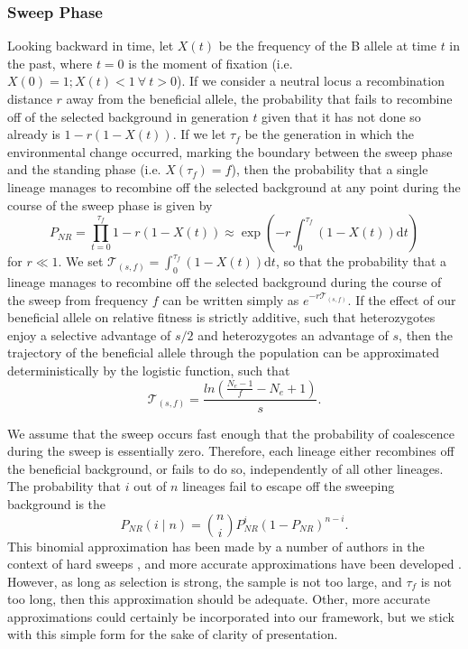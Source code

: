 \documentclass[a4paper,10pt]{article}
\begin{document}
\subsubsection{Sweep Phase}
Looking backward in time, let $X\left(t\right)$ be the frequency of the B allele at time $t$ in the past, where $t=0$ is the moment of fixation (i.e. $X\left(0\right) = 1; X\left(t\right) < 1\ \forall\ t > 0$). If we consider a neutral locus a recombination distance $r$ away from the beneficial allele, the probability that  fails to recombine off of the selected background in generation $t$ given that it has not done so already is $1-r\left(1-X(t)\right)$. If we let $\tau_{f}$ be the generation in which the environmental change occurred, marking the boundary between the sweep phase and the standing phase (i.e. $X\left(\tau_{f}\right) = f$), then the probability that a single lineage manages to recombine off the selected background at any point during the course of the sweep phase is given by
\begin{equation}
P_{NR} = \prod_{t=0}^{\tau_{f}} 1-r\left(1-X(t)\right)  \approx \exp \left(-r \int_0^{\tau_{f}}(1-X\left(t\right))\mathrm{d} t \right)
\end{equation}
for $r \ll 1$. We set  $\mathcal{T}_{\left(s,f\right)} = \int_0^{\tau_{f}}(1-X\left(t\right))\mathrm{d}t$, so that the probability that a lineage manages to recombine off the selected background during the course of the sweep from frequency $f$ can be written simply as $e^{-r\mathcal{T}_{\left(s,f\right)}}$. If the effect of our beneficial allele on relative fitness is strictly additive, such that heterozygotes enjoy a selective advantage of $s/2$ and heterozygotes an advantage of $s$, then the trajectory of the beneficial allele through the population can be approximated deterministically by the logistic function, such that 
\begin{equation}
	\mathcal{T}_{\left(s,f\right)} = \frac{ln\left(\frac{N_e - 1}{f}-N_e + 1\right)}{s}.
\end{equation}

We assume that the sweep occurs fast enough that the probability of coalescence during the sweep is essentially zero. Therefore, each lineage either recombines off the beneficial background, or fails to do so, independently of all other lineages. The probability that $i$ out of $n$ lineages fail to escape off the sweeping background is the
\begin{equation}
P_{NR}(i \mid n) = {n \choose i} P_{NR}^{i} (1-P_{NR})^{n-i}.
\end{equation}
This binomial approximation has been made by a number of authors in the context of hard sweeps \citep{Barton1998}, and more accurate approximations have been developed \citep{Durrett:2004fl,Durrett:2005fr,Etheridge:2006fk,Messer:2012ie}. However, as long as selection is strong, the sample is not too large,  and $\tau_{f}$ is not too long, then this approximation should be adequate. Other, more accurate approximations could certainly be incorporated into our framework, but we stick with this simple form for the sake of clarity of presentation.
\end{document}
